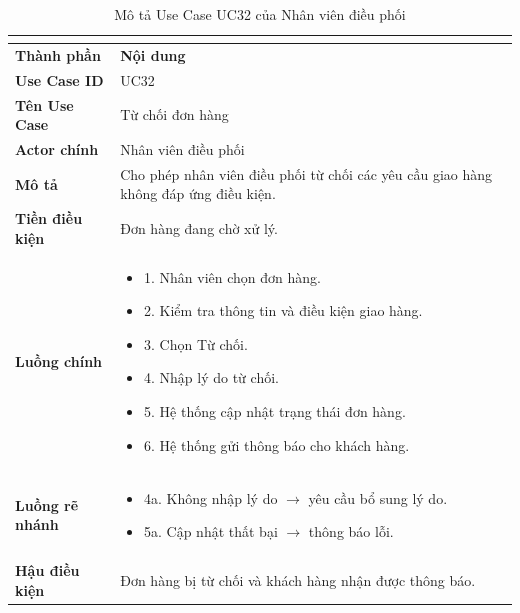 \begin{longtable}{|C{3cm}|L{11cm}|}
\caption{Mô tả Use Case UC32 của Nhân viên điều phối}\\
\label{tab:mo-ta-uc32-dieu-phoi}\\
\hline
\textbf{Thành phần} & \textbf{Nội dung} \\
\hline
\textbf{Use Case ID} & UC32 \\
\hline
\textbf{Tên Use Case} & Từ chối đơn hàng \\
\hline
\textbf{Actor chính} & Nhân viên điều phối \\
\hline
\textbf{Mô tả} &
Cho phép nhân viên điều phối từ chối các yêu cầu giao hàng không đáp ứng điều kiện. \\
\hline
\textbf{Tiền điều kiện} &
Đơn hàng đang chờ xử lý. \\
\hline
\textbf{Luồng chính} &
\begin{itemize}[leftmargin=*,topsep=2pt,itemsep=2pt]
    \item 1. Nhân viên chọn đơn hàng.
    \item 2. Kiểm tra thông tin và điều kiện giao hàng.
    \item 3. Chọn Từ chối.
    \item 4. Nhập lý do từ chối.
    \item 5. Hệ thống cập nhật trạng thái đơn hàng.
    \item 6. Hệ thống gửi thông báo cho khách hàng.
\end{itemize} \\
\hline
\textbf{Luồng rẽ nhánh} &
\begin{itemize}[leftmargin=*,topsep=2pt,itemsep=2pt]
    \item 4a. Không nhập lý do $\rightarrow$ yêu cầu bổ sung lý do.
    \item 5a. Cập nhật thất bại $\rightarrow$ thông báo lỗi.
\end{itemize} \\
\hline
\textbf{Hậu điều kiện} &
Đơn hàng bị từ chối và khách hàng nhận được thông báo. \\
\hline
\end{longtable}


